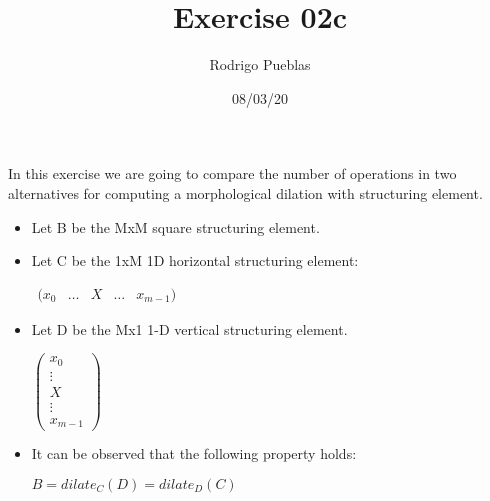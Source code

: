 \documentclass[12pt]{article}
\title{Exercise 02c}
\author{Rodrigo Pueblas}
\date{08/03/20}
\newcommand{\icol}[1]{%
  \left(\begin{matrix}#1\end{matrix}\right)%
}
\newcommand{\irow}[1]{%
  \begin{matrix}(#1)\end{matrix}%
}
\begin{document}
\maketitle

In this exercise we are going to compare the number of
operations in two alternatives for computing a morphological dilation
with structuring element.

\begin{itemize}
  \item Let B be the MxM square structuring element.
  \item Let C be the 1xM 1D horizontal structuring element:
          \begin{center}
          $\irow {x_{0}&\hdots&X&\hdots&x_{m-1}}$
          \end{center}
  \item Let D be the Mx1 1-D vertical structuring element.
          \begin{center}
          $\icol{x_{0}\\\vdots\\X\\\vdots\\x_{m-1}}$
          \end{center}
  \item It can be observed that the following property holds: 
          \begin{center}
          $B = dilate_C (D) = dilate_D (C)$
          \end{center}
\end{itemize}
\end{document}
